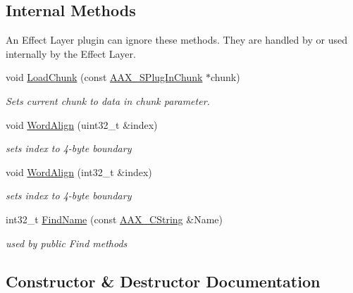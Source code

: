\subsection*{Internal Methods}
\label{_amgrpafe66b15a1c39dd0e784226f4403c2d5}%
An Effect Layer plugin can ignore these methods. They are handled by or used internally by the Effect Layer. \begin{DoxyCompactItemize}
\item 
void \hyperlink{a00014_a25fc41a1060445db4d7bee7a2919460d}{Load\+Chunk} (const \hyperlink{a00125}{A\+A\+X\+\_\+\+S\+Plug\+In\+Chunk} $\ast$chunk)
\begin{DoxyCompactList}\small\item\em Sets current chunk to data in {\itshape chunk} parameter. \end{DoxyCompactList}\item 
void \hyperlink{a00014_acaf10308e9758014bff6872b4260a9e1}{Word\+Align} (uint32\+\_\+t \&index)
\begin{DoxyCompactList}\small\item\em sets {\itshape index} to 4-\/byte boundary \end{DoxyCompactList}\item 
void \hyperlink{a00014_a90dc10c7cb3f1a9af70179be70a8d739}{Word\+Align} (int32\+\_\+t \&index)
\begin{DoxyCompactList}\small\item\em sets {\itshape index} to 4-\/byte boundary \end{DoxyCompactList}\item 
int32\+\_\+t \hyperlink{a00014_a66556bfad37d6541cf4d317a48d099c2}{Find\+Name} (const \hyperlink{a00042}{A\+A\+X\+\_\+\+C\+String} \&Name)
\begin{DoxyCompactList}\small\item\em used by public Find methods \end{DoxyCompactList}\end{DoxyCompactItemize}


\subsection{Constructor \& Destructor Documentation}
\hypertarget{a00014_acf61d78b965c04e6af597379edad5a39}{}
